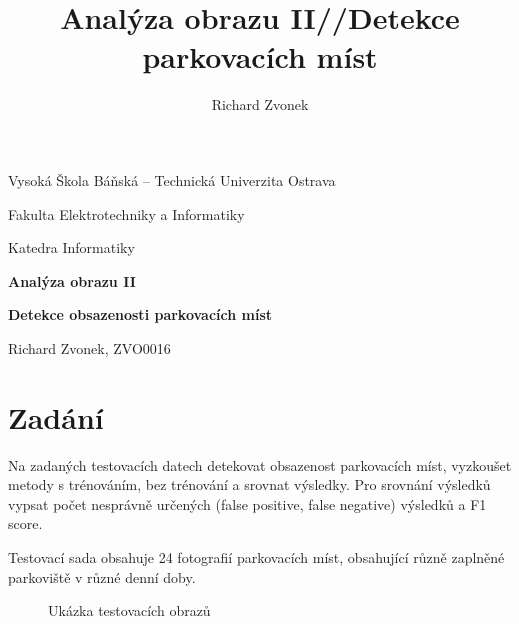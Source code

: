 \documentclass[10pt,a4paper, table]{article}
\title{Analýza obrazu II//Detekce parkovacích míst}
\author{Richard Zvonek}
\begin{document}
\begin{center}
  {\Large Vysoká Škola Báňská – Technická Univerzita Ostrava\par
    Fakulta Elektrotechniky a Informatiky\par
    Katedra Informatiky\par}
  \vspace{26mm}
  {\Huge\bfseries Analýza obrazu II \par}
  \bigskip
  {\Huge\bfseries Detekce obsazenosti parkovacích míst \par}
\end{center}
\vfill
{\Large\number\year\hfill Richard Zvonek, ZVO0016}
\cleardoublepage

\newpage

\tableofcontents

\newpage

\section{Zadání}
Na zadaných testovacích datech detekovat obsazenost parkovacích míst, vyzkoušet metody s trénováním, bez trénování a srovnat výsledky. Pro srovnání výsledků vypsat počet nesprávně určených (false positive, false negative) výsledků a F1 score.\par
Testovací sada obsahuje 24 fotografií parkovacích míst, obsahující různě zaplněné parkoviště v různé denní doby.

\begin{figure}[ht]%
  \centering
  \qquad
  \qquad

  \caption{Ukázka testovacích obrazů}%
  \label{fig:testData}%
\end{figure}
\end{document}
